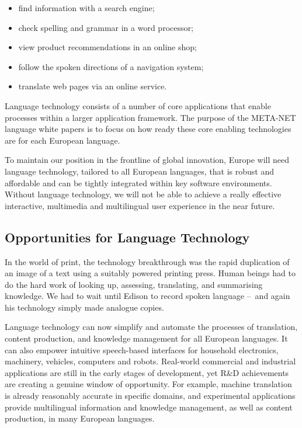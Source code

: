 \begin{multicols}{2}
\begin{itemize}
\item find information with a search engine;
\item check spelling and grammar in a word processor;
\item view product recommendations in an online shop;
\item follow the spoken directions of a navigation system;
\item translate web pages via an online service.
\end{itemize}

Language technology consists of a number of core applications that enable processes within a larger application framework. The purpose of the META-NET language white papers is to focus on how ready these core enabling technologies are for each European language. 


To maintain our position in the frontline of global innovation, Europe will need language technology, tailored to all European languages, that is robust and affordable and can be tightly integrated within key software environments. Without language technology, we will not be able to achieve a really effective interactive, multimedia and multilingual user experience in the near future.

\subsection{Opportunities for Language Technology}

In the world of print, the technology breakthrough was the rapid duplication of an image of a text using a suitably powered printing press. Human beings had to do the hard work of looking up, assessing, translating, and summarising knowledge. We had to wait until Edison to record spoken language --~and again his technology simply made analogue copies.

Language technology can now simplify and automate the processes of translation, content production, and knowledge management for all European languages. It can also empower intuitive speech-based interfaces for household electronics, machinery, vehicles, computers and robots. Real-world commercial and industrial applications are still in the early stages of development, yet R\&D achievements are creating a genuine window of opportunity. For example, machine translation is already reasonably accurate in specific domains, and experimental applications provide multilingual information and knowledge management, as well as content production, in many European languages. 


\end{multicols}
